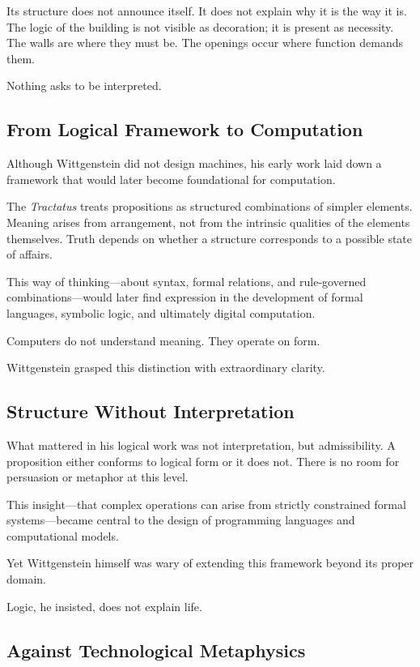 \documentclass[11pt]{article}
\begin{document}
Its structure does not announce itself. It does not explain why it is the way it is. The logic of the building is not visible as decoration; it is present as necessity. The walls are where they must be. The openings occur where function demands them.

Nothing asks to be interpreted.

\subsection*{From Logical Framework to Computation}

Although Wittgenstein did not design machines, his early work laid down a framework that would later become foundational for computation.

The \emph{Tractatus} treats propositions as structured combinations of simpler elements. Meaning arises from arrangement, not from the intrinsic qualities of the elements themselves. Truth depends on whether a structure corresponds to a possible state of affairs.

This way of thinking—about syntax, formal relations, and rule-governed combinations—would later find expression in the development of formal languages, symbolic logic, and ultimately digital computation.

Computers do not understand meaning. They operate on form.

Wittgenstein grasped this distinction with extraordinary clarity.

\subsection*{Structure Without Interpretation}

What mattered in his logical work was not interpretation, but admissibility. A proposition either conforms to logical form or it does not. There is no room for persuasion or metaphor at this level.

This insight—that complex operations can arise from strictly constrained formal systems—became central to the design of programming languages and computational models.

Yet Wittgenstein himself was wary of extending this framework beyond its proper domain.

Logic, he insisted, does not explain life.

\subsection*{Against Technological Metaphysics}
\end{document}
